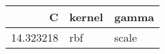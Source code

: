 \begin{tabular}{rll}
\toprule
C & kernel & gamma \\
\midrule
14.323218 & rbf & scale \\
\bottomrule
\end{tabular}
